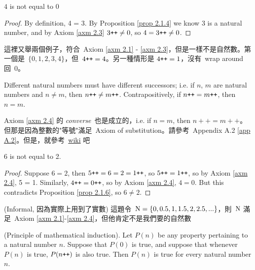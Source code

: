 \begin{proposition}\label{prop 2.1.6}
\(4\) is not equal to \(0\)
\end{proposition}
\begin{proof}
By definition, 4 = 3\INC. By Proposition \ref{prop 2.1.4} we know 3 is a natural number, and by Axiom \ref{axm 2.3} \(3\texttt{++} \neq 0\), so \(4 = 3\texttt{++} \neq 0\).
\end{proof}

\begin{example}\label{example 2.1.7}
這裡又舉兩個例子，符合\ Axiom \ref{axm 2.1} - \ref{axm 2.3}，但是一樣不是自然數。第一個是\ \(\{0,1,2,3,4\}\)，但\ \(4\texttt{++} = 4\)。另一種情形是 \(4\texttt{++} = 1\)，沒有\ wrap around 回\ 0。
\end{example}

\begin{axiom}\label{axm 2.4}
Different natural numbers must have different successors; i.e. if \(n\), \(m\) are natural numbers and \(n \neq m\), then \(n\texttt{++} \neq m\texttt{++}\). Contrapositively, if \(n\texttt{++} = m\texttt{++}\), then \(n = m\).
\end{axiom}

\begin{note}
Axiom \ref{axm 2.4} 的 \emph{converse}\ 也是成立的，i.e. if \(n = m\), then \(n++ = m++\)。但那是因為整數的"等號"滿足\ Axiom of substitution。請參考\ Appendix A.2 \ref{app A.2}。但是，就參考\ \href{https://www.wikiwand.com/en/Peano_axioms#/Formulation}{wiki} 吧
\end{note}

\begin{proposition}\label{prop 2.1.8}
6 is not equal to 2.
\end{proposition}
\begin{proof}
Suppose \( 6 = 2 \), then \( 5\texttt{++} = 6 = 2 = 1\texttt{++} \), so \(5\texttt{++} = 1\texttt{++} \), so by Axiom \ref{axm 2.4}, 5 = 1. Similarly, \(4\texttt{++} = 0\texttt{++}\), so by Axiom \ref{axm 2.4}, \(4 = 0\). But this contradicts Proposition \ref{prop 2.1.6}, so \(6 \neq 2\).
\end{proof}

\begin{example}\label{example 2.1.9}(Informal, 因為實際上用到了實數)
這題令\ \( \textup{N} = \{0, 0.5, 1, 1.5, 2, 2.5, ...\}\)，則\ \(\textup{N}\) 滿足\ Axiom \ref{axm 2.1}-\ref{axm 2.4}，但他肯定不是我們要的自然數
\end{example}

\begin{axiom}\label{axm 2.5} (Principle of mathematical induction). Let \(P(n)\) be any property pertaining to a natural number \(n\). Suppose that \(P(0)\) is true, and suppose that whenever \(P(n)\) is true, \(P(n\texttt{++})\) is also true. Then \(P(n)\) is true for every natural number \(n\).
\end{axiom}

